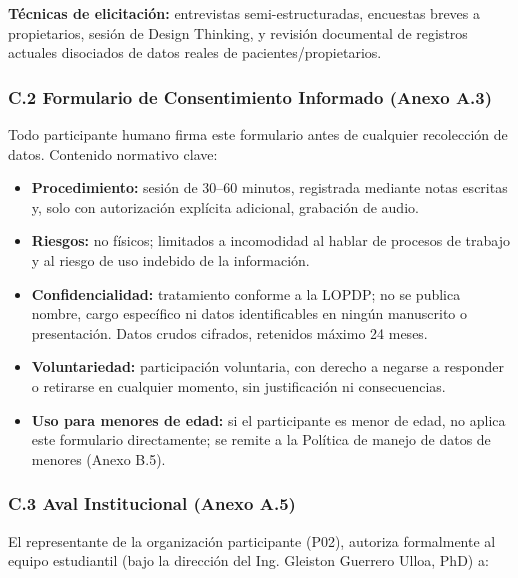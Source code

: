 \documentclass[
]{article}
\begin{document}
\textbf{Técnicas de elicitación:} entrevistas semi-estructuradas, encuestas breves a propietarios, sesión de Design Thinking, y revisión documental de registros actuales disociados de datos reales de pacientes/propietarios.

\subsubsection{C.2 Formulario de Consentimiento Informado (Anexo A.3)}\label{c2-consentimiento-informado}

Todo participante humano firma este formulario antes de cualquier recolección de datos. Contenido normativo clave:

\begin{itemize}
  \item \textbf{Procedimiento:} sesión de 30--60 minutos, registrada mediante notas escritas y, solo con autorización explícita adicional, grabación de audio.
  \item \textbf{Riesgos:} no físicos; limitados a incomodidad al hablar de procesos de trabajo y al riesgo de uso indebido de la información.
  \item \textbf{Confidencialidad:} tratamiento conforme a la LOPDP; no se publica nombre, cargo específico ni datos identificables en ningún manuscrito o presentación. Datos crudos cifrados, retenidos máximo 24 meses.
  \item \textbf{Voluntariedad:} participación voluntaria, con derecho a negarse a responder o retirarse en cualquier momento, sin justificación ni consecuencias.
  \item \textbf{Uso para menores de edad:} si el participante es menor de edad, no aplica este formulario directamente; se remite a la Política de manejo de datos de menores (Anexo B.5).
\end{itemize}

\subsubsection{C.3 Aval Institucional (Anexo A.5)}\label{c3-aval-institucional}

El representante de la organización participante (P02), autoriza formalmente al equipo estudiantil (bajo la dirección del Ing. Gleiston Guerrero Ulloa, PhD) a:
\end{document}
